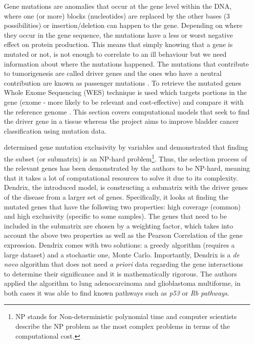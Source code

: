 Gene mutations are anomalies that occur at the gene level within the DNA, where one (or more) blocks (nucleotides) are replaced by the other bases (3 possibilities) or insertion/deletion can happen to the gene. Depending on where they occur in the gene sequence, the mutations have a less or worst negative effect on protein production. This means that simply knowing that a gene is mutated or not, is not enough to correlate to an ill behaviour but we need information about where the mutations happened. The mutations that contribute to tumorigenesis are called driver genes and the ones who have a neutral contribution are known as passenger mutations \cite{Ciriello2012-hi}. To retrieve the mutated genes Whole Exome Sequencing (WES) technique is used which targets portions in the gene (exome - more likely to be relevant and cost-effective) and compare it with the reference genome \cite{Schneider2016-ml}. This section covers computational models that seek to find the driver gene in a tissue whereas the project aims to improve bladder cancer classification using mutation data. 

\citet{Vandin2012-cf} determined gene mutation exclusivity by variables and demonstrated that finding the subset (or submatrix) is an NP-hard problem\footnote{ NP stands for Non-deterministic polynomial time and computer scientists describe the NP problem as the most complex problems in terms of the computational cost.}. Thus, the selection process of the relevant genes has been demonstrated by the authors to be NP-hard, meaning that it takes a lot of computational resources to solve it due to its complexity. Dendrix, the introduced model, is constructing a submatrix with the driver genes of the disease from a larger set of genes. Specifically, it looks at finding the mutated genes that have the following two properties: high coverage (common) and high exclusivity (specific to some samples). The genes that need to be included in the submatrix are chosen by a weighting factor, which takes into account the above two properties as well as the Pearson Correlation of the gene expression. Dendrix comes with two solutions: a greedy algorithm (requires a large dataset) and a stochastic one, Monte Carlo. Importantly, Dendrix is a \textit{de novo} algorithm that does not need \textit{a priori} data regarding the gene interactions to determine their significance and it is mathematically rigorous. The authors applied the algorithm to lung adenocarcinoma and glioblastoma multiforme, in both cases it was able to find known pathways such as \textit{p53} or \textit{Rb pathways}.


